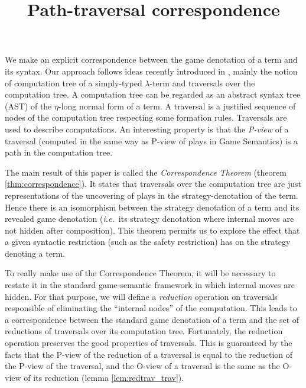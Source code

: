 

\title{Path-traversal correspondence}


\maketitle \tableofcontents \bigskip

We make an explicit correspondence between the
game denotation of a term and its syntax. Our approach follows ideas
recently introduced in \cite{OngLics2006}, mainly the notion of
computation tree of a simply-typed $\lambda$-term and traversals
over the computation tree. A computation tree can be regarded as an
abstract syntax tree (AST) of the $\eta$-long normal form of a term.
A traversal is a justified sequence of nodes of the computation tree
respecting some formation rules. Traversals are used to describe
computations. An interesting property is that the \emph{P-view} of a
traversal (computed in the same way as P-view of plays in Game
Semantics) is a path in the computation tree.

The main result of this paper is called the
\emph{Correspondence Theorem} (theorem \ref{thm:correspondence}). It
states that traversals over the computation tree are just
representations of the uncovering of plays in the
strategy-denotation of the term. Hence there is an isomorphism
between the strategy denotation of a term and its revealed game
denotation ({\it i.e.}~its strategy denotation where internal moves are
not hidden after composition). This theorem permits us to explore
the effect that a given syntactic restriction (such as the safety restriction) has on the strategy
denoting a term.

To really make use of the Correspondence Theorem, it will be
necessary to restate it in the standard game-semantic framework in
which internal moves are hidden. For that purpose, we will define a
\emph{reduction} operation on traversals responsible of eliminating
the ``internal nodes'' of the computation. This leads to a
correspondence between the standard game denotation of a term and
the set of reductions of traversals over its computation tree.
Fortunately, the reduction operation preserves the good properties
of traversals. This is guaranteed by the facts that the P-view of
the reduction of a traversal is equal to the reduction of the P-view
of the traversal, and the O-view of a traversal is the same as the
O-view of its reduction (lemma \ref{lem:redtrav_trav}). \vspace{8pt}

